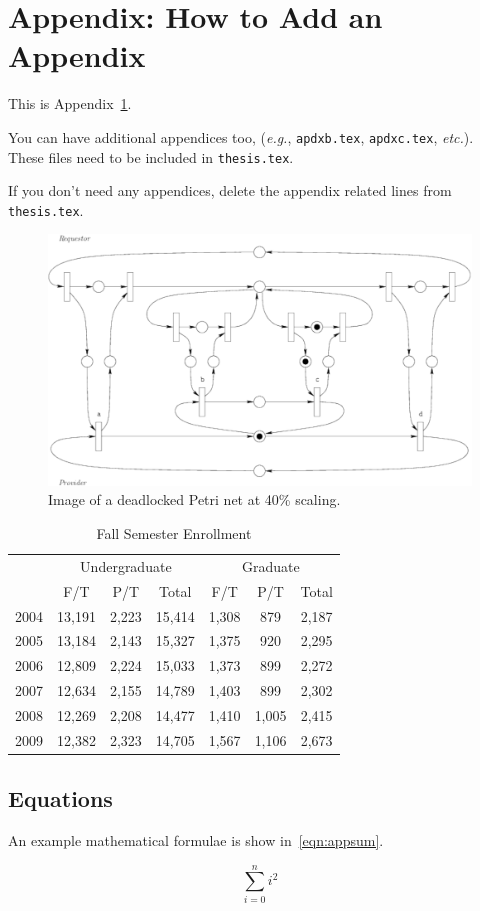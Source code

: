 
\chapter{Appendix: How to Add an Appendix}
\label{apdx:a}

This is Appendix~\ref{apdx:a}.

You can have additional appendices too, (\emph{e.g.}, \texttt{apdxb.tex},
\texttt{apdxc.tex}, \emph{etc.}). These files need to be included in
\texttt{thesis.tex}.

If you don't need any appendices, delete the appendix
related lines from \texttt{thesis.tex}.

\begin{figure}
\centering
\includegraphics[scale=0.40]{Images/db-deadlock}
\caption{\label{fig:app-db-deadlock} Image of a deadlocked Petri net at 40\%
  scaling.} 
\end{figure}

\begin{table}[!htbp]
\centering
\caption{Fall Semester Enrollment}
\label{tab:app-pop}
\vspace{2mm}
\begin{tabular}{c||c|c|c||c|c|c|}
\hline
	& \multicolumn{3}{c||}{Undergraduate}
	& \multicolumn{3}{c|}{Graduate} \\
\cline{2-7}
     & F/T & P/T & Total & F/T & P/T & Total \\
\cline{2-7}
2004 & 13,191 & 2,223 & 15,414 & 1,308 & 879 & 2,187 \\
2005 & 13,184 & 2,143 & 15,327 & 1,375 & 920 & 2,295 \\
2006 & 12,809 & 2,224 & 15,033 & 1,373 & 899 & 2,272 \\
2007 & 12,634 & 2,155 & 14,789 & 1,403 & 899 & 2,302 \\
2008 & 12,269 & 2,208 & 14,477 & 1,410 &1,005& 2,415 \\
2009 & 12,382 & 2,323 & 14,705 & 1,567 &1,106& 2,673 \\
\hline
\end{tabular}
\end{table}

\section{Equations}
An example mathematical formulae is show in~\ref{eqn:appsum}.

\begin{equation}\label{eqn:appsum}
\sum_{i = 0}^{n} i^2
\end{equation}
